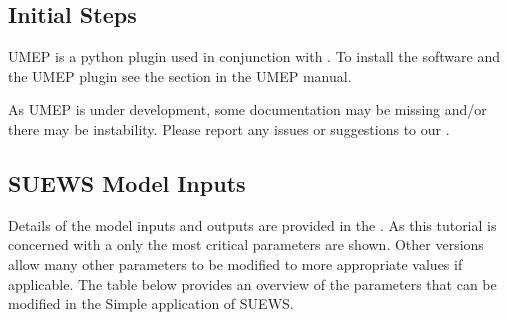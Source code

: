 \documentclass[letterpaper,10pt,english]{sphinxmanual}
\begin{document}
\subsection{Initial Steps}
\label{\detokenize{Tutorials/IntroductionToSuews:initial-steps}}
UMEP is a python plugin used in conjunction with
. To install the software and the UMEP
plugin see the {\hyperref[\detokenize{Getting_Started:getting-started}]{}} section in the UMEP manual.

As UMEP is under development, some documentation may be missing and/or
there may be instability. Please report any issues or suggestions to our
.


\subsection{SUEWS Model Inputs}
\label{\detokenize{Tutorials/IntroductionToSuews:suews-model-inputs}}
Details of the model inputs and outputs are provided in the . As this tutorial is
concerned with a  only the most critical
parameters are shown. Other versions allow many other parameters to be
modified to more appropriate values if applicable. The table below
provides an overview of the parameters that can be modified in the
Simple application of SUEWS.
\end{document}
